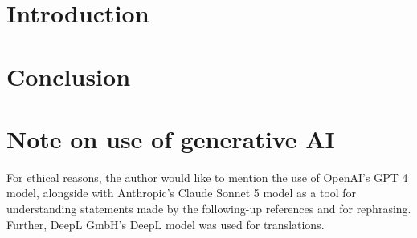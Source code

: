 



\newpage
\tableofcontents
\section{Introduction}




\section{Conclusion}

% 
\renewcommand{\thesection}{\arabic{section}}
\setcounter{section}{3}
\section{Note on use of generative AI}
For ethical reasons, the author would like to mention the use of OpenAI's GPT 4 model, alongside with Anthropic's
Claude Sonnet 5 model as a tool for understanding statements made by the following-up references and for rephrasing.
Further, DeepL GmbH's DeepL model was used for translations.



